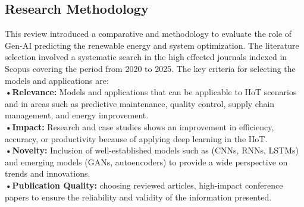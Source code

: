 \documentclass[journal]{IEEEtran}
\begin{document}
\subsection{Research Methodology}
This review introduced a comparative and methodology to evaluate the role of Gen-AI predicting the renewable energy and system optimization. The literature selection involved a systematic search in the high effected journals indexed in Scopus covering the period from 2020 to 2025. The key criteria for selecting the models and applications are:\\
\textbf{•Relevance:} Models and applications that can be applicable to IIoT scenarios and in areas such as predictive maintenance, quality control, supply chain management, and energy improvement.\\
\textbf{•Impact:} Research and case studies shows an improvement in efficiency, accuracy, or productivity because of applying deep learning in the IIoT.\\
\textbf{•Novelty:} Inclusion of well-established models such as (CNNs, RNNs, LSTMs) and emerging models (GANs, autoencoders) to provide a wide perspective on trends and innovations.\\
\textbf{•Publication Quality:} choosing reviewed articles, high-impact conference papers to ensure the reliability and validity of the information presented.
\end{document}
